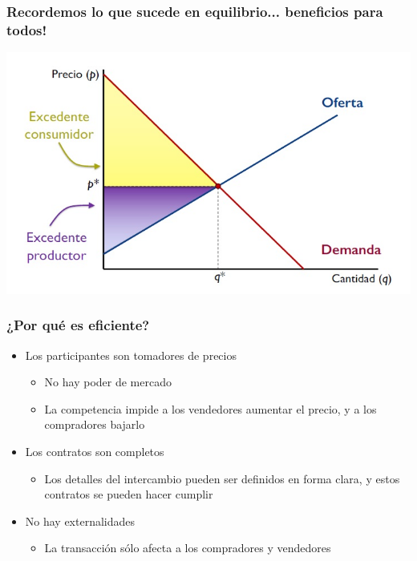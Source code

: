 \documentclass{beamer}
\begin{document}
\begin{frame}
\frametitle{Recordemos lo que sucede en equilibrio... beneficios para todos!}
\begin{center}
\includegraphics[scale=0.55]{Figures/Tema_07.23_equilibrioyexcedente.jpg}
\end{center}
\end{frame}

\begin{frame}
\frametitle{ ¿Por qué es eficiente?}
\begin{itemize}
    \item Los participantes son tomadores de precios
    \begin{itemize}
        \item No hay poder de mercado
        \item La competencia impide a los vendedores aumentar el precio, y a los compradores bajarlo
    \end{itemize}
    \item Los contratos son completos
        \begin{itemize}
        \item Los detalles del intercambio pueden ser definidos en forma clara, y estos contratos se pueden hacer cumplir
        \end{itemize}
    \item No hay externalidades
        \begin{itemize}
        \item La transacción sólo afecta a los compradores y vendedores
        \end{itemize}
\end{itemize}
\end{frame}
\end{document}
